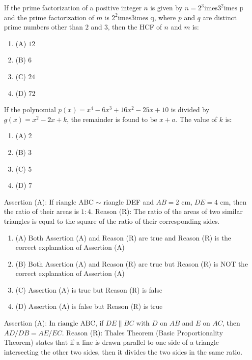 \documentclass[12pt,a4paper]{exam}
\begin{document}
\begin{questions}
\question[1] If the prime factorization of a positive integer $n$ is given by $n = 2^3 \text{imes} 3^2 \text{imes p}$ and the prime factorization of $m$ is $2^2 \text{imes} 3 \text{imes q}$, where $p$ and $q$ are distinct prime numbers other than $2$ and $3$, then the HCF of $n$ and $m$ is:
\begin{enumerate}[label=(\Alph*)]
  \item (A) $12$
  \item (B) $6$
  \item (C) $24$
  \item (D) $72$
\end{enumerate}
\vspace{0.15cm}

\question[1] If the polynomial $p(x) = x^4 - 6x^3 + 16x^2 - 25x + 10$ is divided by $g(x) = x^2 - 2x + k$, the remainder is found to be $x + a$. The value of $k$ is:
\begin{enumerate}[label=(\Alph*)]
  \item (A) 2
  \item (B) 3
  \item (C) 5
  \item (D) 7
\end{enumerate}
\vspace{0.15cm}

\question[1] Assertion (A): If 	riangle ABC $\sim$ 	riangle DEF and $AB = 2$ cm, $DE = 4$ cm, then the ratio of their areas is $1:4$. Reason (R): The ratio of the areas of two similar triangles is equal to the square of the ratio of their corresponding sides.
\begin{enumerate}[label=(\Alph*)]
  \item (A) Both Assertion (A) and Reason (R) are true and Reason (R) is the correct explanation of Assertion (A)
  \item (B) Both Assertion (A) and Reason (R) are true but Reason (R) is NOT the correct explanation of Assertion (A)
  \item (C) Assertion (A) is true but Reason (R) is false
  \item (D) Assertion (A) is false but Reason (R) is true
\end{enumerate}
\vspace{0.15cm}

\question[1] Assertion (A): In $\text{riangle ABC}$, if $DE \parallel BC$ with $D$ on $AB$ and $E$ on $AC$, then $AD/DB = AE/EC$. Reason (R): Thales Theorem (Basic Proportionality Theorem) states that if a line is drawn parallel to one side of a triangle intersecting the other two sides, then it divides the two sides in the same ratio.


\end{questions}
\end{document}
